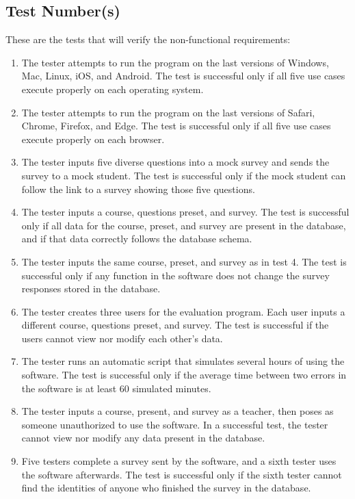 \documentclass{article}
\begin{document}
\subsection{Test Number(s)}

These are the tests that will verify the non-functional requirements:

\begin{enumerate}
  \item The tester attempts to run the program on the last versions of Windows, Mac, Linux, iOS, and Android. The test is successful only if all five use cases execute properly on each operating system.
  \item The tester attempts to run the program on the last versions of Safari, Chrome, Firefox, and Edge. The test is successful only if all five use cases execute properly on each browser.
  \item The tester inputs five diverse questions into a mock survey and sends the survey to a mock student. The test is successful only if the mock student can follow the link to a survey showing those five questions.
  \item The tester inputs a course, questions preset, and survey. The test is successful only if all data for the course, preset, and survey are present in the database, and if that data correctly follows the database schema.
  \item The tester inputs the same course, preset, and survey as in test 4. The test is successful only if any function in the software does not change the survey responses stored in the database.
  \item The tester creates three users for the evaluation program. Each user inputs a different course, questions preset, and survey. The test is successful if the users cannot view nor modify each other's data.
  \item The tester runs an automatic script that simulates several hours of using the software. The test is successful only if the average time between two errors in the software is at least 60 simulated minutes.
  \item The tester inputs a course, present, and survey as a teacher, then poses as someone unauthorized to use the software. In a successful test, the tester cannot view nor modify any data present in the database.
  \item Five testers complete a survey sent by the software, and a sixth tester uses the software afterwards. The test is successful only if the sixth tester cannot find the identities of anyone who finished the survey in the database.

\end{enumerate}
\end{document}
